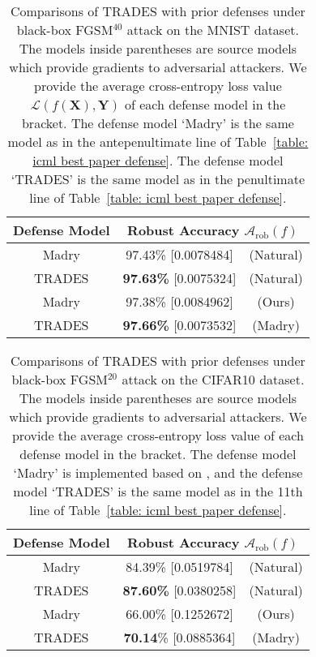 \documentclass[11pt]{article}
\newcommand{\adv}{\mathrm{rob}}
\newcommand{\X}{\bm{X}}
\newcommand{\Y}{\bm{Y}}
\newcommand{\0}{\mathbf{0}}
\newcommand{\1}{\mathbf{1}}
\newcommand{\cA}{\mathcal{A}}
\newcommand{\cL}{\mathcal{L}}
\begin{document}
\begin{table}
	\caption{Comparisons of TRADES with prior defenses under black-box FGSM$^{40}$ attack on the MNIST dataset. The models inside parentheses are source models which provide gradients to adversarial attackers. We provide the average cross-entropy loss value $\cL(f(\X),\Y)$ of each defense model in the bracket. The defense model `Madry' is the same model as in the antepenultimate line of Table~\ref{table: icml best paper defense}. The defense model `TRADES' is the same model as in the penultimate line of Table~\ref{table: icml best paper defense}.}
	\vspace{+0.2cm}
	\label{table: MNIST FGSM-40 black-box defense}
	\centering
\begin{tabular}{c||cc}\hline
		Defense Model & \multicolumn{2}{c}{Robust Accuracy $\cA_\adv(f)$}
		\\
		\hline
		{Madry} & 97.43\% [0.0078484]  & (Natural)   
		\\ 
		\hline
		{TRADES} & \textbf{97.63\%} [0.0075324] &  (Natural)
		\\
		\hline
		{Madry} & 97.38\%  [0.0084962] & (Ours) \\ 
		\hline
		{TRADES} &  \textbf{97.66\%}  [0.0073532] &  (Madry)  
		\\
		\hline
	\end{tabular}
\end{table}


\vspace{-0.3cm}
\begin{table}
	\caption{Comparisons of TRADES with prior defenses under black-box FGSM$^{20}$ attack on the CIFAR10 dataset. The models inside parentheses are source models which provide gradients to adversarial attackers.  We provide the average cross-entropy loss value of each defense model in the bracket. The defense model `Madry' is implemented based on \cite{madry2018towards}, and  the defense model `TRADES' is the same model as in the 11th line of Table~\ref{table: icml best paper defense}.}
	\vspace{+0.2cm}
	\label{table: CIFAR10 FGSM-20 black-box defense}
	\centering
\begin{tabular}{c||cc}\hline
Defense Model & \multicolumn{2}{c}{Robust Accuracy $\cA_\adv(f)$}
		\\
		\hline
		{Madry} & 84.39\% [0.0519784] & (Natural) \\ 
		\hline
		{TRADES} & \textbf{87.60\%} [0.0380258] & (Natural)  \\
		\hline
		{Madry} & 66.00\% [0.1252672]  &(Ours) \\ 
		\hline
		{TRADES} &  \textbf{70.14}\% [0.0885364] & (Madry)  \\
		\hline
\end{tabular}
\end{table}
\end{document}
